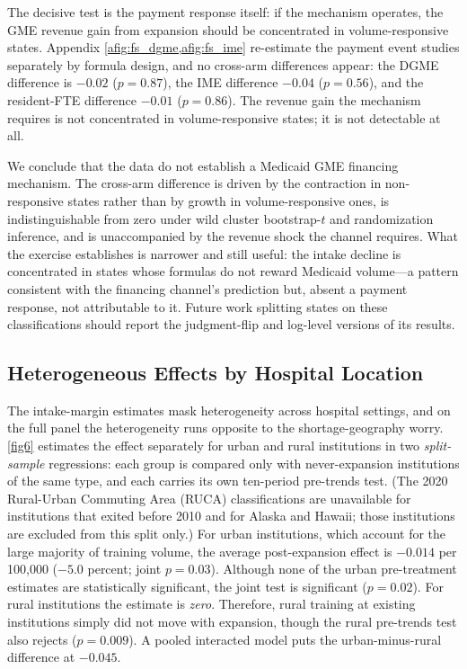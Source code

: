 The decisive test is the payment response itself: if the mechanism operates, the GME revenue gain from expansion should be concentrated in volume-responsive states. Appendix \cref{afig:fs_dgme,afig:fs_ime} re-estimate the payment event studies separately by formula design, and no cross-arm differences appear: the DGME difference is $-0.02$ ($p = 0.87$), the IME difference $-0.04$ ($p = 0.56$), and the resident-FTE difference $-0.01$ ($p = 0.86$). The revenue gain the mechanism requires is not concentrated in volume-responsive states; it is not detectable at all.

We conclude that the data do not establish a Medicaid GME financing mechanism. The cross-arm difference is driven by the contraction in non-responsive states rather than by growth in volume-responsive ones, is indistinguishable from zero under wild cluster bootstrap-$t$ and randomization inference, and is unaccompanied by the revenue shock the channel requires. What the exercise establishes is narrower and still useful: the intake decline is concentrated in states whose formulas do not reward Medicaid volume---a pattern consistent with the financing channel's prediction but, absent a payment response, not attributable to it. Future work splitting states on these classifications should report the judgment-flip and log-level versions of its results.

\subsection{Heterogeneous Effects by Hospital Location}\label{subsec:location}

The intake-margin estimates mask heterogeneity across hospital settings, and on the full panel the heterogeneity runs opposite to the shortage-geography worry. \cref{fig6} estimates the effect separately for urban and rural institutions in two \emph{split-sample} regressions: each group is compared only with never-expansion institutions of the same type, and each carries its own ten-period pre-trends test. (The 2020 Rural-Urban Commuting Area (RUCA) classifications are unavailable for institutions that exited before 2010 and for Alaska and Hawaii; those institutions are excluded from this split only.) For urban institutions, which account for the large majority of training volume, the average post-expansion effect is $-0.014$ per 100{,}000 ($-5.0$ percent; joint $p = 0.03$). Although none of the urban pre-treatment estimates are statistically significant, the joint test is significant ($p = 0.02$). For rural institutions the estimate is \emph{zero}. Therefore, rural training at existing institutions simply did not move with expansion, though the rural pre-trends test also rejects ($p = 0.009$). A pooled interacted model puts the urban-minus-rural difference at $-0.045$.

